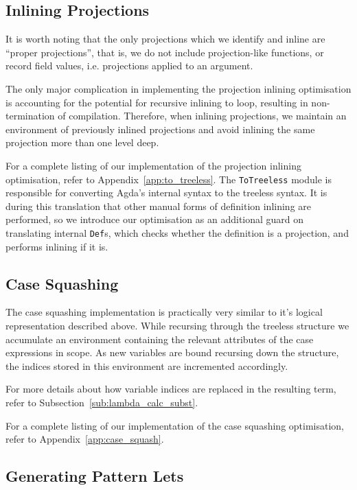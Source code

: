 \subsection{Inlining Projections}

It is worth noting that the only projections which we identify and inline are ``proper projections'', that is, we do not include projection-like functions, or record field values, i.e. projections applied to an argument.

The only major complication in implementing the projection inlining optimisation is accounting for the potential for recursive inlining to loop, resulting in non-termination of compilation. Therefore, when inlining projections, we maintain an environment of previously inlined projections and avoid inlining the same projection more than one level deep.

For a complete listing of our implementation of the projection inlining optimisation, refer to Appendix~\ref{app:to_treeless}. The \lstinline{ToTreeless} module is responsible for converting Agda's internal syntax to the treeless syntax. It is during this translation that other manual forms of definition inlining are performed, so we introduce our optimisation as an additional guard on translating internal \lstinline{Def}s, which checks whether the definition is a projection, and performs inlining if it  is.

\subsection{Case Squashing}

The case squashing implementation is practically very similar to it's logical representation described above. While recursing through the treeless structure we accumulate an environment containing the relevant attributes of the case expressions in scope. As new variables are bound recursing down the structure, the indices stored in this environment are incremented accordingly.

For more details about how variable indices are replaced in the resulting term, refer to Subsection~\ref{sub:lambda_calc_subst}.

For a complete listing of our implementation of the case squashing optimisation, refer to Appendix~\ref{app:case_squash}.

\subsection{Generating Pattern Lets}


